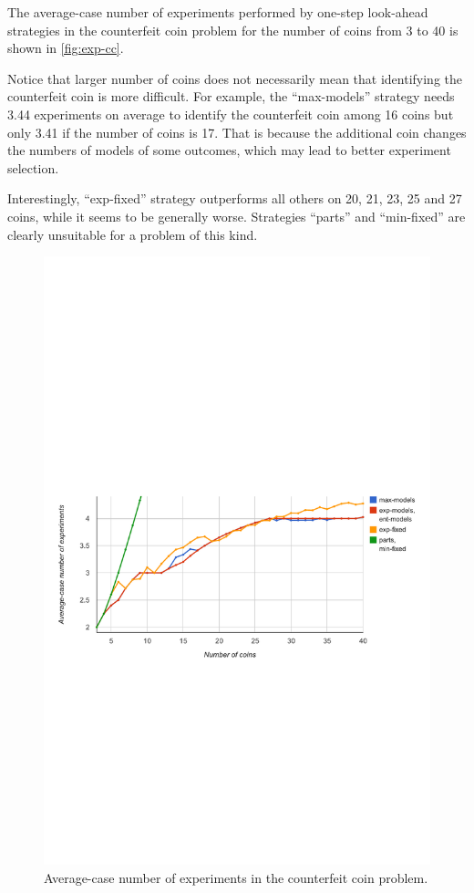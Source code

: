 The average-case number of experiments performed by one-step look-ahead
  strategies in the counterfeit coin problem
  for the number of coins from 3 to 40 is shown in \autoref{fig:exp-cc}.

Notice that larger number of coins does not necessarily mean that
  identifying the counterfeit coin is more difficult.
For example, the ``max-models'' strategy needs
  3.44 experiments on average to identify the counterfeit coin
  among 16 coins but only 3.41 if the number of coins is 17.
That is because the additional coin changes
  the numbers of models of some outcomes,
  which may lead to better experiment selection.

Interestingly, ``exp-fixed'' strategy outperforms all others
  on 20, 21, 23, 25 and 27 coins, while it seems to be
  generally worse.
Strategies ``parts'' and ``min-fixed'' are clearly unsuitable for
  a problem of this kind.

\begin{figure}[h]
\begin{center}
\includegraphics[width=\textwidth]{pictures/graph-cc.pdf}
\caption{Average-case number of experiments in the counterfeit coin problem.}
\label{fig:exp-cc}
\end{center}
\end{figure}

